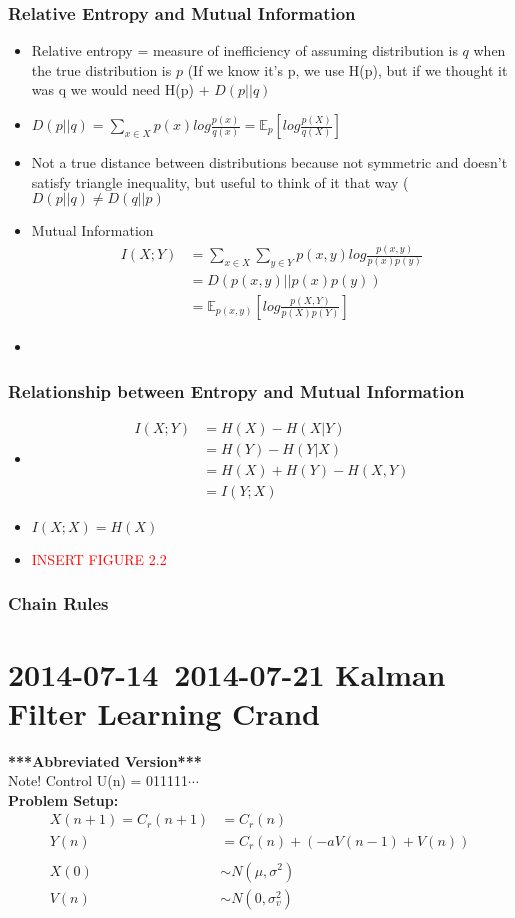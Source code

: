 \documentclass[leqno,twocolumn]{article}
\begin{document}
\subsubsection{Relative Entropy and Mutual Information}
\begin{itemize}
\item Relative entropy = measure of inefficiency of assuming distribution is $q$ when the true distribution is $p$ (If we know it's p, we use H(p), but if we thought it was q we would need H(p) + $D(p||q)$
\item $D(p||q) = \sum_{x \in X} p(x) log \frac{p(x)}{q(x)} = \mathbb{E}_p[log \frac{p(X)}{q(X)}]$
\item Not a true distance between distributions because not symmetric and doesn't satisfy triangle inequality, but useful to think of it that way ($D(p||q) \neq D(q||p)$
\item Mutual Information
\begin{align*}
I(X; Y) &= \sum_{x \in X} \sum_{y \in Y} p(x,y) log \frac{p(x,y)}{p(x)p(y)}\\
&= D(p(x,y) || p(x)p(y))\\
&= \mathbb{E}_{p(x,y)} [log \frac{p(X,Y)}{p(X)p(Y)}]
\end{align*}
\item 
\end{itemize}

\subsubsection{Relationship between Entropy and Mutual Information}
\begin{itemize}
\item \begin{align*}
I(X; Y) &= H(X) - H(X|Y)\\
&= H(Y) - H(Y|X)\\
&= H(X) + H(Y) - H(X,Y)\\
&= I(Y; X)
\end{align*}
\item $I(X; X) = H(X)$
\item \textcolor{red}{INSERT FIGURE 2.2}
\end{itemize}

\subsubsection{Chain Rules}

\section{2014-07-14~2014-07-21 Kalman Filter Learning Crand}
\textbf{***Abbreviated Version***}\\
Note! Control U(n) = 011111$\cdots$\\
\setcounter{equation}{0}
\textbf{Problem Setup:}
\begin{align}
X(n+1) = C_r(n+1) &= C_r(n)\\
Y(n) &= C_r(n) + (-aV(n-1) + V(n))\\
\\
X(0) &\sim N(\mu, \sigma^2)\\
V(n) & \sim N(0, \sigma_v^2)
\end{align}
\end{document}
